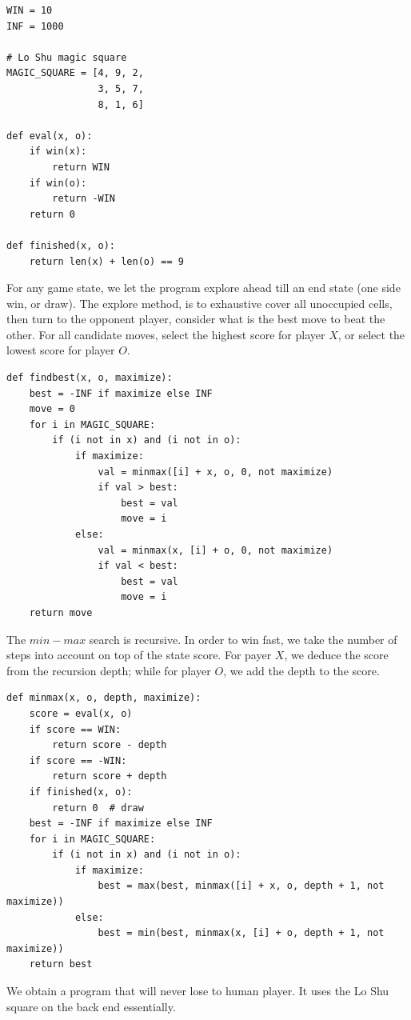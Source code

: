 \documentclass[UTF8]{article}
\begin{document}
\begin{enumerate}
\begin{lstlisting}
WIN = 10
INF = 1000

# Lo Shu magic square
MAGIC_SQUARE = [4, 9, 2,
                3, 5, 7,
                8, 1, 6]

def eval(x, o):
    if win(x):
        return WIN
    if win(o):
        return -WIN
    return 0

def finished(x, o):
    return len(x) + len(o) == 9
\end{lstlisting}

For any game state, we let the program explore ahead till an end state (one side win, or draw). The explore method, is to exhaustive cover all unoccupied cells, then turn to the opponent player, consider what is the best move to beat the other. For all candidate moves, select the highest score for player $X$, or select the lowest score for player $O$.

\begin{lstlisting}
def findbest(x, o, maximize):
    best = -INF if maximize else INF
    move = 0
    for i in MAGIC_SQUARE:
        if (i not in x) and (i not in o):
            if maximize:
                val = minmax([i] + x, o, 0, not maximize)
                if val > best:
                    best = val
                    move = i
            else:
                val = minmax(x, [i] + o, 0, not maximize)
                if val < best:
                    best = val
                    move = i
    return move
\end{lstlisting}

The $min-max$ search is recursive. In order to win fast, we take the number of steps into account on top of the state score. For payer $X$, we deduce the score from the recursion depth; while for player $O$, we add the depth to the score.

\begin{lstlisting}
def minmax(x, o, depth, maximize):
    score = eval(x, o)
    if score == WIN:
        return score - depth
    if score == -WIN:
        return score + depth
    if finished(x, o):
        return 0  # draw
    best = -INF if maximize else INF
    for i in MAGIC_SQUARE:
        if (i not in x) and (i not in o):
            if maximize:
                best = max(best, minmax([i] + x, o, depth + 1, not maximize))
            else:
                best = min(best, minmax(x, [i] + o, depth + 1, not maximize))
    return best
\end{lstlisting}

We obtain a program that will never lose to human player. It uses the Lo Shu square on the back end essentially.


\end{enumerate}
\end{document}
